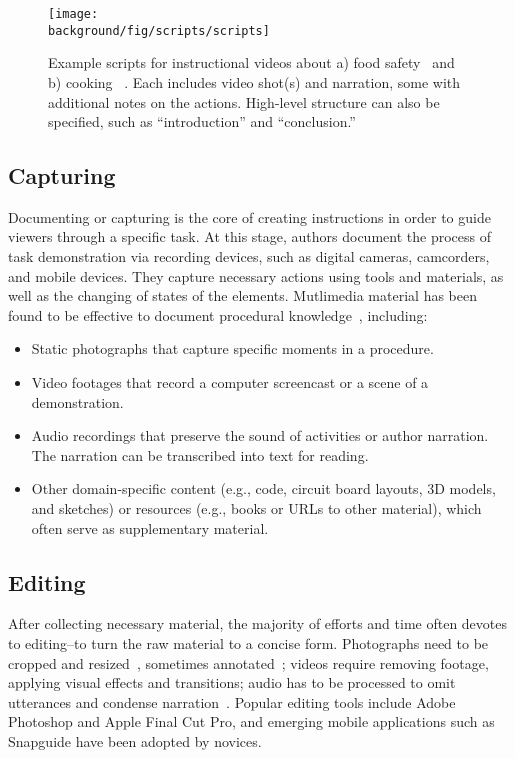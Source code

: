 \begin{figure*}[th!]
  \centering
  \texttt{[image: \\background/fig/scripts/scripts]}
  \caption{Example scripts for instructional videos about a) food safety~\protect\cite{WisconsinFoodSafetyScript} and b) cooking ~\protect\cite{SouthernIllinoisScript}. Each includes video shot(s) and narration, some with additional notes on the actions. High-level structure can also be specified, such as ``introduction'' and ``conclusion.''}
  \label{fig:background_scripts}
\end{figure*}

\subsection{Capturing}
Documenting or capturing is the core of creating instructions in order to guide viewers through a specific task. At this stage, authors document the process of task demonstration via recording devices, such as digital cameras, camcorders, and mobile devices. They capture necessary actions using tools and materials, as well as the changing of states of the elements. %
%
Mutlimedia material has been found to be effective to document procedural knowledge~\cite{Kuznetsov:2010:REA:1868914.1868950,Wakkary:2015:TAH:2702123.2702550}, including:

\begin{itemize}
  \item Static photographs that capture specific moments in a procedure.
  \item Video footages that record a computer screencast or a scene of a demonstration.
  \item Audio recordings that preserve the sound of activities or author narration. The narration can be transcribed into text for reading.
  \item Other domain-specific content (e.g., code, circuit board layouts, 3D models, and sketches) or resources (e.g., books or URLs to other material), which often serve as supplementary material.
\end{itemize}

\subsection{Editing}
After collecting necessary material, the majority of efforts and time often devotes to editing--to turn the raw material to a concise form.
Photographs need to be cropped and resized~\cite{Tseng:2014:PVP:2598510.2598540}, sometimes annotated~\cite{Torrey:2007he}; videos require removing footage, applying visual effects and transitions; audio has to be processed to omit utterances and condense narration~\cite{Chi:2013:DGC:2501988.2502052}. Popular editing tools include Adobe Photoshop and Apple Final Cut Pro, and emerging mobile applications such as Snapguide have been adopted by novices.

